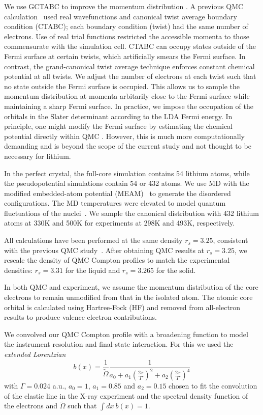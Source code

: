 \documentclass[aps,prb,showpacs,preprintnumbers,amsmath,amssymb,superscriptaddress,twocolumn]{revtex4-1}
\begin{document}
We use GCTABC to improve the momentum distribution \cite{PhysRevLett.97.076404,Holzmann2009}. A previous QMC calculation~\cite{Filippi1999} used real wavefunctions and canonical twist average boundary condition (CTABC); each boundary condition (twist) had the same number of electrons. Use of real trial functions restricted the accessible momenta to those commensurate with the simulation cell. CTABC can occupy states outside of the Fermi surface at certain twists, which artificially smears the Fermi surface. In contrast, the grand-canonical twist average technique enforces constant chemical potential at all twists. We adjust the number of electrons at each twist such that no state outside the Fermi surface is occupied. This allows us to sample the momentum distribution at momenta arbitarily close to the Fermi surface while maintaining a sharp Fermi surface. In practice, we impose the occupation of the orbitals in the Slater determinant according to the LDA Fermi energy. In principle, one might modify the Fermi surface by estimating the chemical potential directly within QMC \cite{yang2019electronic}. However, this is much more computationally demanding and is beyond the scope of the current study and not thought to be necessary for lithium.

In the perfect crystal, the full-core simulation contains 54 lithium atoms, while the pseudopotential simulations contain 54 or 432 atoms. We use MD with the modified embedded-atom potential (MEAM)~\cite{Baskes1992} to generate the disordered configurations.
The MD temperatures were elevated to model quantum fluctuations of the nuclei~\cite{Filippi1998}.
We sample the canonical distribution with 432 lithium atoms at 330K and 500K for experiments at 298K and 493K, respectively.

All calculations have been performed at the same density $r_s=3.25$, consistent with the previous QMC study~\cite{Filippi1999}. After obtaining QMC results at $r_s=3.25$, we rescale the density of QMC Compton profiles to match the experimental densities: $r_s=3.31$ for the liquid and $r_s=3.265$ for the solid.

In both QMC and experiment, we assume the momentum distribution of the core electrons to remain unmodified from that in the isolated atom. The atomic core orbital is calculated using Hartree-Fock (HF) and removed from all-electron results to produce valence electron contributions.

We convolved our QMC Compton profile with a broadening function to model the instrument resolution and final-state interaction. For this we used the \emph{extended Lorentzian}
\begin{equation}
b(x) = \frac{1}{\tilde{\Omega}} \frac{1}{
a_0+a_1(\frac{2x}{\Gamma})^2+a_2(\frac{2x}{\Gamma})^4
}\label{eq:elorentz}
\end{equation}
with $\Gamma=0.024$ a.u., $a_0=1$, $a_1=0.85$ and $a_2=0.15$ chosen to fit the convolution of the elastic line in the X-ray experiment and the spectral density function of the electrons and $\tilde{\Omega}$ such that $\int dx ~b(x)=1$. 
\end{document}
